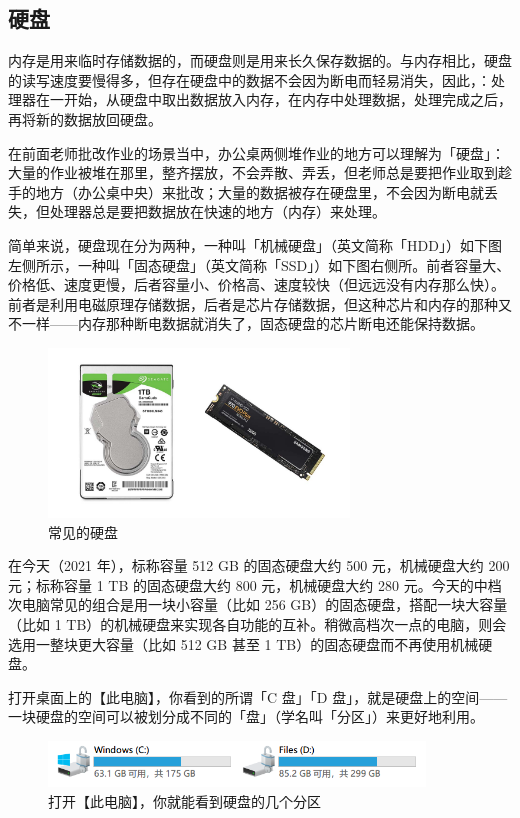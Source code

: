 \subsection{硬盘}

内存是用来临时存储数据的，而硬盘则是用来长久保存数据的。与内存相比，硬盘的读写速度要慢得多，但存在硬盘中的数据不会因为断电而轻易消失，因此，：处理器在一开始，从硬盘中取出数据放入内存，在内存中处理数据，处理完成之后，再将新的数据放回硬盘。

在前面老师批改作业的场景当中，办公桌两侧堆作业的地方可以理解为「硬盘」：大量的作业被堆在那里，整齐摆放，不会弄散、弄丢，但老师总是要把作业取到趁手的地方（办公桌中央）来批改；大量的数据被存在硬盘里，不会因为断电就丢失，但处理器总是要把数据放在快速的地方（内存）来处理。

简单来说，硬盘现在分为两种，一种叫「机械硬盘」（英文简称「HDD」）如下图左侧所示，一种叫「固态硬盘」（英文简称「SSD」）如下图右侧所。前者容量大、价格低、速度更慢，后者容量小、价格高、速度较快（但远远没有内存那么快）。前者是利用电磁原理存储数据，后者是芯片存储数据，但这种芯片和内存的那种又不一样——内存那种断电数据就消失了，固态硬盘的芯片断电还能保持数据。

\begin{figure}[H]
  \centering
  \includegraphics[width=8cm]{assets/Disks.jpg}
  \caption{常见的硬盘}
  \label{disks}
\end{figure}

在今天（2021 年），标称容量 512 GB 的固态硬盘大约 500 元，机械硬盘大约 200 元；标称容量 1 TB 的固态硬盘大约 800 元，机械硬盘大约 280 元。今天的中档次电脑常见的组合是用一块小容量（比如 256 GB）的固态硬盘，搭配一块大容量（比如 1 TB）的机械硬盘来实现各自功能的互补。稍微高档次一点的电脑，则会选用一整块更大容量（比如 512 GB 甚至 1 TB）的固态硬盘而不再使用机械硬盘。

打开桌面上的【此电脑】，你看到的所谓「C 盘」「D 盘」，就是硬盘上的空间——一块硬盘的空间可以被划分成不同的「盘」（学名叫「分区」）来更好地利用。

\begin{figure}[H]
  \centering
  \includegraphics[width=10cm]{assets/Partition.png}
  \caption{打开【此电脑】，你就能看到硬盘的几个分区}
  \label{partitions}
\end{figure}


